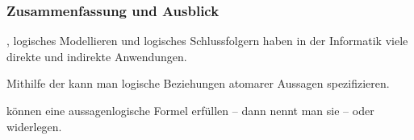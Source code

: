 \documentclass[aspectratio=1610,onlymath]{beamer}
\begin{document}
\begin{frame}\frametitle{Zusammenfassung und Ausblick}

, logisches Modellieren und logisches Schlussfolgern haben in der Informatik viele direkte und indirekte Anwendungen.
\bigskip

Mithilfe der  kann man logische Beziehungen atomarer Aussagen spezifizieren.
\bigskip

 können eine aussagenlogische Formel erfüllen -- dann nennt man sie  -- oder widerlegen.
\bigskip


\end{frame}
\end{document}
